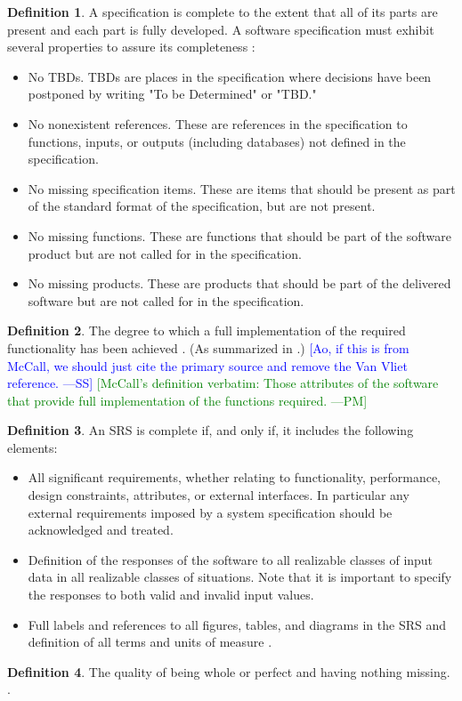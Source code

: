 \documentclass[letterpaper,cleveref]{lipics-v2019}
\newcommand{\authornote}[3]{\textcolor{#1}{[#3 ---#2]}}
\newcommand{\authornote}[3]{}
\newcommand{\wss}[1]{\authornote{blue}{SS}{#1}} %
\newcommand{\pmi}[1]{\authornote{green}{PM}{#1}} %
\theoremstyle{definition}
\newtheorem{defn}{Definition}
\begin{document}
\begin{defn}
  \label{CompletenessSelected}
  A specification is complete to the extent that all of its parts are present
  and each part is fully developed. A software specification must exhibit
  several properties to assure its completeness \citep{Boehm1984}:
  \begin{itemize}
  \item No TBDs. TBDs are places in the specification where decisions have been
    postponed by writing "To be Determined" or "TBD."
  \item No nonexistent references. These are references in the specification to
    functions, inputs, or outputs (including databases) not defined in the
    specification.
  \item No missing specification items. These are items that should be present
    as part of the standard format of the specification, but are not present.
  \item No missing functions. These are functions that should be part of the
    software product but are not called for in the specification.
  \item No missing products. These are products that should be part of the
    delivered software but are not called for in the specification.
  \end{itemize}
\end{defn}

\begin{defn}
  The degree to which a full implementation of the required functionality has
  been achieved \citep{McCallEtAl1977}. (As summarized in \citet{VanVliet2000}.)
  \wss{Ao, if this is from McCall, we should just cite the primary source and
    remove the Van Vliet reference.} \pmi{McCall's definition verbatim: Those attributes of the software that provide full implementation of the functions required.}
\end{defn}

\begin{defn}
	An SRS is complete if, and only if, it includes the following elements:
\begin{itemize}
\item All significant requirements, whether relating to functionality,
performance, design constraints, attributes, or external interfaces. In
particular any external requirements imposed by a system specification should be
acknowledged and treated.
\item Definition of the responses of the software to all realizable classes of
input data in all realizable classes of situations. Note that it is important to
specify the responses to both valid and invalid input values.
\item Full labels and references to all figures, tables, and diagrams in the SRS
and definition of all terms and units of measure \citep{IEEE1998}.
	\end{itemize}
\end{defn}
\begin{defn}
The quality of being whole or perfect and having nothing missing.
\citep{CambridgeCompleteness2019}.
\end{defn}
\end{document}
